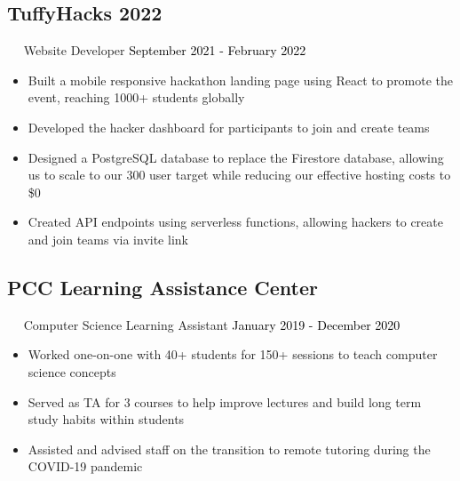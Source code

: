 \documentclass{article}
\newcommand{\resumesection}[3]{
    \subsection*{#1}
    \ 
    \ 
    \small
    \textcolor{csufgrey}{#2}
    \normalsize
    \hfill
    \textcolor{black}{#3}
    \normalsize
}
\begin{document}
\resumesection{TuffyHacks 2022}{Website Developer}{September 2021 - February 2022}
\begin{itemize}
    \item Built a mobile responsive hackathon landing page using React to promote the event, reaching 1000+ students globally
    \item Developed the hacker dashboard for participants to join and create teams
    \item Designed a PostgreSQL database to replace the Firestore database, allowing us to scale to our 300 user target while reducing our effective hosting costs to \$0
    \item Created API endpoints using serverless functions, allowing hackers to create and join teams via invite link
\end{itemize}
\resumesection{PCC Learning Assistance Center}{Computer Science Learning Assistant}{January 2019 - December 2020}
\begin{itemize}
    \item Worked one-on-one with 40+ students for 150+ sessions to teach computer science concepts
    \item Served as TA for 3 courses to help improve lectures and build long term study habits within students
    \item Assisted and advised staff on the transition to remote tutoring during the COVID-19 pandemic
\end{itemize}
\end{document}
